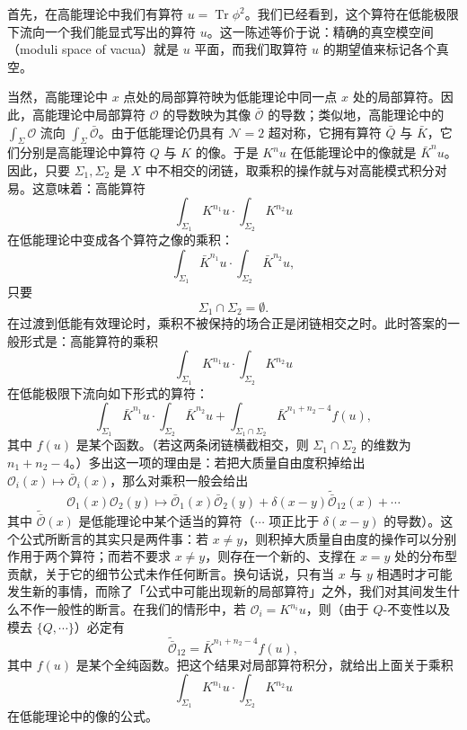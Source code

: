 首先，在高能理论中我们有算符 $u=\operatorname{Tr}\phi^2$。我们已经看到，这个算符在低能极限下流向一个我们能显式写出的算符 $u$。这一陈述等价于说：精确的真空模空间（moduli space of vacua）就是 $u$ 平面，而我们取算符 $u$ 的期望值来标记各个真空。

当然，高能理论中 $x$ 点处的局部算符映为低能理论中同一点 $x$ 处的局部算符。因此，高能理论中局部算符 $\mathcal{O}$ 的导数映为其像 $\bar{\mathcal{O}}$ 的导数；类似地，高能理论中的 $\int_\Sigma\mathcal{O}$ 流向 $\int_\Sigma\bar{\mathcal{O}}$。由于低能理论仍具有 $\mathcal{N}=2$ 超对称，它拥有算符 $\bar Q$ 与 $\bar K$，它们分别是高能理论中算符 $Q$ 与 $K$ 的像。于是 $K^nu$ 在低能理论中的像就是 $\bar K^nu$。因此，只要 $\Sigma_1,\Sigma_2$ 是 $X$ 中不相交的闭链，取乘积的操作就与对高能模式积分对易。这意味着：高能算符
\[
\int_{\Sigma_1}K^{n_1}u\cdot\int_{\Sigma_2}K^{n_2}u
\]
在低能理论中变成各个算符之像的乘积：
\[
\int_{\Sigma_1}\bar K^{n_1}u\cdot\int_{\Sigma_2}\bar K^{n_2}u,
\]
只要
\[
\Sigma_1\cap\Sigma_2=\emptyset.
\]
在过渡到低能有效理论时，乘积不被保持的场合正是闭链相交之时。此时答案的一般形式是：高能算符的乘积
\[
\int_{\Sigma_1}K^{n_1}u\cdot\int_{\Sigma_2}K^{n_2}u
\]
在低能极限下流向如下形式的算符：
\[
\int_{\Sigma_1}\bar K^{n_1}u\cdot\int_{\Sigma_2}\bar K^{n_2}u+\int_{\Sigma_1\cap\Sigma_2}\bar K^{n_1+n_2-4}f(u),
\]
其中 $f(u)$ 是某个函数。（若这两条闭链横截相交，则 $\Sigma_1\cap\Sigma_2$ 的维数为 $n_1+n_2-4$。）多出这一项的理由是：若把大质量自由度积掉给出 $\mathcal{O}_i(x)\mapsto\bar{\mathcal{O}}_i(x)$，那么对乘积一般会给出
\[
\mathcal{O}_1(x)\mathcal{O}_2(y)\mapsto\bar{\mathcal{O}}_1(x)\bar{\mathcal{O}}_2(y)+\delta(x-y)\tilde{\bar{\mathcal{O}}}_{12}(x)+\cdots
\]
其中 $\tilde{\bar{\mathcal{O}}}(x)$ 是低能理论中某个适当的算符（$\cdots$ 项正比于 $\delta(x-y)$ 的导数）。这个公式所断言的其实只是两件事：若 $x\ne y$，则积掉大质量自由度的操作可以分别作用于两个算符；而若不要求 $x\ne y$，则存在一个新的、支撑在 $x=y$ 处的分布型贡献，关于它的细节公式未作任何断言。换句话说，只有当 $x$ 与 $y$ 相遇时才可能发生新的事情，而除了「公式中可能出现新的局部算符」之外，我们对其间发生什么不作一般性的断言。在我们的情形中，若 $\mathcal{O}_i=K^{n_i}u$，则（由于 $Q$-不变性以及模去 $\{Q,\cdots\}$）必定有
\[
\tilde{\bar{\mathcal{O}}}_{12}=\bar K^{n_1+n_2-4}f(u),
\]
其中 $f(u)$ 是某个全纯函数。把这个结果对局部算符积分，就给出上面关于乘积
\[
\int_{\Sigma_1}K^{n_1}u\cdot\int_{\Sigma_2}K^{n_2}u
\]
在低能理论中的像的公式。


